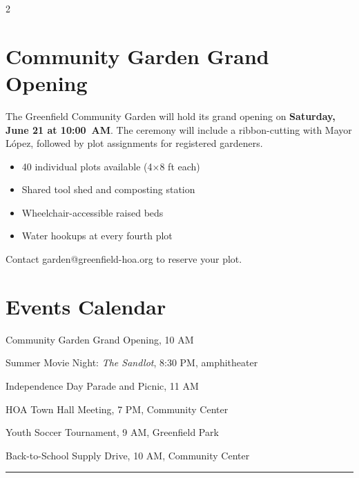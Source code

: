 \documentclass[
    language=english,
    doctype=newsletter,
    institution=none,
]{../../omnilatex}
\begin{document}
\begin{multicols}{2}

\section*{Community Garden Grand Opening}

The Greenfield Community Garden will hold its grand opening on \textbf{Saturday,
June 21 at 10:00~AM}. The ceremony will include a ribbon-cutting with Mayor
López, followed by plot assignments for registered gardeners.

\begin{itemize}[leftmargin=*, nosep]
    \item 40 individual plots available (4$\times$8 ft each)
    \item Shared tool shed and composting station
    \item Wheelchair-accessible raised beds
    \item Water hookups at every fourth plot
\end{itemize}

Contact garden@greenfield-hoa.org to reserve your plot.

\columnbreak

\section*{Events Calendar}

\begin{description}[style=nextline, leftmargin=1.2cm]
    \item[Jun 21] Community Garden Grand Opening, 10 AM
    \item[Jun 28] Summer Movie Night: \emph{The Sandlot}, 8:30 PM, amphitheater
    \item[Jul 4] Independence Day Parade and Picnic, 11 AM
    \item[Jul 12] HOA Town Hall Meeting, 7 PM, Community Center
    \item[Jul 19] Youth Soccer Tournament, 9 AM, Greenfield Park
    \item[Aug 2] Back-to-School Supply Drive, 10 AM, Community Center
\end{description}

\end{multicols}

\vspace{0.5em}
\noindent\rule{\textwidth}{0.4pt}
\vspace{0.5em}
\end{document}
